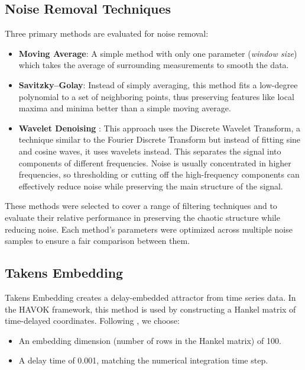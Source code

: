 \documentclass[11pt]{article}
\begin{document}
	\subsection{Noise Removal Techniques}
	Three primary methods are evaluated for noise removal:
	\begin{itemize}
		\item \textbf{Moving Average}: A simple method with only one parameter (\emph{window size}) which takes the average of surrounding measurements to smooth the data.
		\item \textbf{Savitzky--Golay}: Instead of simply averaging, this method fits a low-degree polynomial to a set of neighboring points, thus preserving features like local maxima and minima better than a simple moving average.
		\item \textbf{Wavelet Denoising} \citep{luo2012}: This approach uses the Discrete Wavelet Transform, a technique similar to the Fourier Discrete Transform but instead of fitting sine and cosine waves, it uses wavelets instead. This separates the signal into components of different frequencies. Noise is usually concentrated in higher frequencies, so thresholding or cutting off the high-frequency components can effectively reduce noise while preserving the main structure of the signal.
	\end{itemize}
	These methods were selected to cover a range of filtering techniques and to evaluate their relative performance in preserving the chaotic structure while reducing noise. Each method’s parameters were optimized across multiple noise samples to ensure a fair comparison between them.
	
	\subsection{Takens Embedding}
	Takens Embedding creates a delay-embedded attractor from time series data. In the HAVOK framework, this method is used by constructing a Hankel matrix of time-delayed coordinates. Following \citep{brunton2017}, we choose:
	\begin{itemize}
		\item An embedding dimension (number of rows in the Hankel matrix) of 100.
		\item A delay time of 0.001, matching the numerical integration time step.
	\end{itemize}
	
\end{document}
